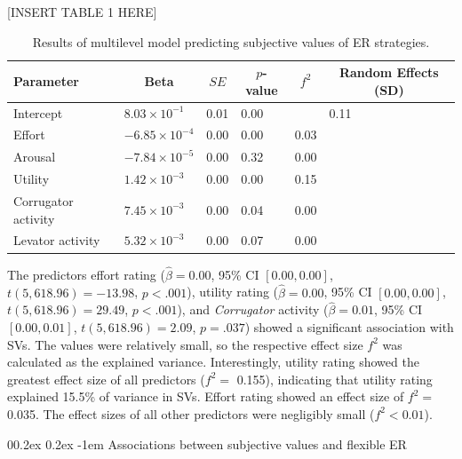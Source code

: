 \documentclass[
  man,floatsintext]{apa6}
\makeatletter
\let\oldparagraph\paragraph
\renewcommand{\paragraph}[1]{\oldparagraph{#1}\mbox{}}
\renewcommand{\paragraph}{\@startsection{paragraph}{4}{\parindent}%
  {0\baselineskip \@plus 0.2ex \@minus 0.2ex}%
  {-1em}%
  {\normalfont\normalsize\bfseries\itshape\typesectitle}}
\makeatother
\begin{document}
{[}INSERT TABLE 1 HERE{]}

\begin{table}[H]

\begin{center}
\begin{threeparttable}

\caption{\label{tab:TabMLMH5}Results of multilevel model predicting subjective values of ER strategies.}

\begin{tabular}{llllll}
\toprule
Parameter & \multicolumn{1}{c}{Beta} & \multicolumn{1}{c}{$SE$} & \multicolumn{1}{c}{$p$-value} & \multicolumn{1}{c}{$f^{2}$} & \multicolumn{1}{c}{Random Effects (SD)}\\
\midrule
Intercept & $8.03 \times 10^{-1}$ & 0.01 & 0.00 &  & 0.11\\
Effort & $-6.85 \times 10^{-4}$ & 0.00 & 0.00 & 0.03 & \\
Arousal & $-7.84 \times 10^{-5}$ & 0.00 & 0.32 & 0.00 & \\
Utility & $1.42 \times 10^{-3}$ & 0.00 & 0.00 & 0.15 & \\
Corrugator activity & $7.45 \times 10^{-3}$ & 0.00 & 0.04 & 0.00 & \\
Levator activity & $5.32 \times 10^{-3}$ & 0.00 & 0.07 & 0.00 & \\
\bottomrule
\end{tabular}

\end{threeparttable}
\end{center}

\end{table}

The predictors effort rating (\(\hat{\beta} = 0.00\), 95\% CI \([0.00, 0.00]\), \(t(5,618.96) = -13.98\), \(p < .001\)), utility rating (\(\hat{\beta} = 0.00\), 95\% CI \([0.00, 0.00]\), \(t(5,618.96) = 29.49\), \(p < .001\)), and \emph{Corrugator} activity (\(\hat{\beta} = 0.01\), 95\% CI \([0.00, 0.01]\), \(t(5,618.96) = 2.09\), \(p = .037\)) showed a significant association with SVs.
The values were relatively small, so the respective effect size \(f^{2}\) was calculated as the explained variance.
Interestingly, utility rating showed the greatest effect size of all predictors (\(f^{2}=\) 0.155), indicating that utility rating explained 15.5\% of variance in SVs.
Effort rating showed an effect size of \(f^{2}=\) 0.035.
The effect sizes of all other predictors were negligibly small (\(f^{2}< 0.01\)).

\hypertarget{associations-between-subjective-values-and-flexible-er}{%
\paragraph{Associations between subjective values and flexible ER}\label{associations-between-subjective-values-and-flexible-er}}
\end{document}
